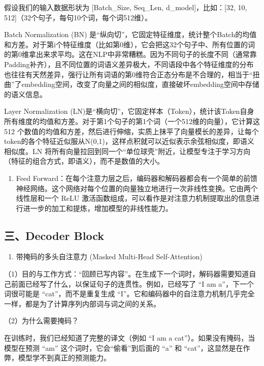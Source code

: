 假设我们的输入数据形状为 {[}Batch\_Size, Seq\_Len, d\_model{]}，比如：{[}32, 10, 512{]}（32个句子，每句10个词，每个词512维）。

Batch Normalization (BN) 是``纵向切''，它固定特征维度，统计整个Batch的均值和方差。对于第i个特征维度（比如第0维），它会把这32个句子中、所有位置的词的第0维拿出来求平均。这在NLP中非常糟糕。因为不同句子的长度不同（通常靠Padding补齐），且不同位置的词语义差异极大，不同语段中各个特征维度的分布也往往有天然差异，强行让所有词语的第0维符合正态分布是不合理的，相当于``扭曲''了embedding空间，改变了向量之间的相似度，直接破坏embedding空间中存储的语义信息。

Layer Normalization (LN)是``横向切''，它固定样本（Token），统计该Token自身所有维度的均值和方差。对于第1个句子的第1个词（一个512维的向量），它计算这 512 个数值的均值和方差，然后进行伸缩，实质上抹平了向量模长的差异，让每个token的各个特征近似服从N(0,1)，这样点积就可以近似表示余弦相似度，即语义相似度。LN 将所有向量拉回到同一个``单位球壳''附近，让模型专注于学习方向（特征的组合方式，即语义），而不是数值的大小。

\begin{enumerate}
\def\labelenumi{\arabic{enumi}.}
\setcounter{enumi}{3}
\tightlist
\item
  Feed Forward：在每个注意力层之后，编码器和解码器都会有一个简单的前馈神经网络。这个网络对每个位置的向量独立地进行一次非线性变换。它由两个线性层和一个 ReLU 激活函数组成，可以看作是对注意力机制提取出的信息进行进一步的加工和提炼，增加模型的非线性能力。
\end{enumerate}

\hypertarget{ux4e09decoder-block}{%
\subsection{三、Decoder Block}\label{ux4e09decoder-block}}

\begin{enumerate}
\def\labelenumi{\arabic{enumi}.}
\tightlist
\item
  带掩码的多头自注意力 (Masked Multi-Head Self-Attention)
\end{enumerate}

（1）目的与工作方式：``回顾已写内容''。在生成下一个词时，解码器需要知道自己前面已经写了什么，以保证句子的连贯性。例如，已经写了 ``I am a''，下一个词很可能是 ``cat''，而不是重复生成 ``I''。它和编码器中的自注意力机制几乎完全一样，都是为了计算序列内部词与词之间的关系。

（2）为什么需要掩码？

在训练时，我们已经知道了完整的译文（例如 ``I am a cat''）。如果没有掩码，当模型在预测 ``am'' 这个词时，它会``偷看''到后面的 ``a'' 和 ``cat''，这显然是在作弊，模型学不到真正的预测能力。


